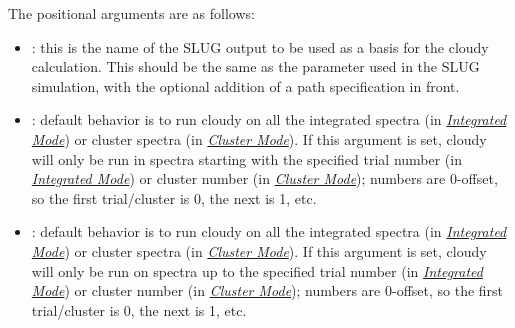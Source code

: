 \documentclass[letterpaper,10pt,english]{sphinxmanual}
\begin{document}
The positional arguments are as follows:
\begin{itemize}
\item {} 
: this is the name of the SLUG output to be used
as a basis for the cloudy calculation. This should be the same as
the  parameter used in the SLUG simulation, with the
optional addition of a path specification in front.

\item {} 
: default behavior is to run cloudy on all the
integrated spectra (in {\hyperref[cloudy:sssec\string-cloudy\string-integrated\string-mode]{\emph{Integrated Mode}}}) or
cluster spectra (in {\hyperref[cloudy:sssec\string-cloudy\string-cluster\string-mode]{\emph{Cluster Mode}}}). If this
argument is set, cloudy will only be run in spectra starting with
the specified trial number (in {\hyperref[cloudy:sssec\string-cloudy\string-integrated\string-mode]{\emph{Integrated Mode}}})
or cluster number (in {\hyperref[cloudy:sssec\string-cloudy\string-cluster\string-mode]{\emph{Cluster Mode}}}); numbers are
0-offset, so the first trial/cluster is 0, the next is 1, etc.

\item {} 
: default behavior is to run cloudy on all the
integrated spectra (in {\hyperref[cloudy:sssec\string-cloudy\string-integrated\string-mode]{\emph{Integrated Mode}}}) or
cluster spectra (in {\hyperref[cloudy:sssec\string-cloudy\string-cluster\string-mode]{\emph{Cluster Mode}}}). If this
argument is set, cloudy will only be run on spectra up to the
specified trial number (in {\hyperref[cloudy:sssec\string-cloudy\string-integrated\string-mode]{\emph{Integrated Mode}}}) or
cluster number (in {\hyperref[cloudy:sssec\string-cloudy\string-cluster\string-mode]{\emph{Cluster Mode}}}); numbers are
0-offset, so the first trial/cluster is 0, the next is 1, etc.

\end{itemize}
\end{document}
